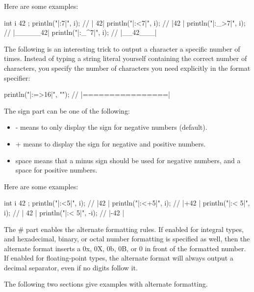Here are some examples:

\begin{cpp}
int i { 42 };
println("|{:7}|", i);     // |     42|
println("|{:<7}|", i);    // |42     |
println("|{:_>7}|", i);   // |_____42|
println("|{:_^7}|", i);   // |__42___|
\end{cpp}

The following is an interesting trick to output a character a specific number of times. Instead of typing a string literal yourself containing the correct number of characters, you specify the number of characters you need explicitly in the format specifier:

\begin{cpp}
println("|{:=>16}|", ""); // |================|
\end{cpp}


The sign part can be one of the following:

\begin{itemize}
\item
- means to only display the sign for negative numbers (default).

\item
+ means to display the sign for negative and positive numbers.

\item
space means that a minus sign should be used for negative numbers, and a space for positive numbers.
\end{itemize}

Here are some examples:

\begin{cpp}
int i { 42 };
println("|{:<5}|", i);   // |42  |
println("|{:<+5}|", i);  // |+42 |
println("|{:< 5}|", i);  // | 42 |
println("|{:< 5}|", -i); // |-42 |
\end{cpp}

\mySamllsection{\#}

The \# part enables the alternate formatting rules. If enabled for integral types, and hexadecimal, binary, or octal number formatting is specified as well, then the alternate format inserts a 0x, 0X, 0b, 0B, or 0 in front of the formatted number. If enabled for floating-point types, the alternate format will always output a decimal separator, even if no digits follow it.

The following two sections give examples with alternate formatting.


